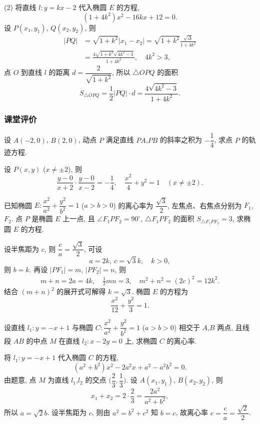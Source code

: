     (2) 将直线 $l\colon y=kx-2$ 代入椭圆 $E$ 的方程,
    \[(1+4k^2)x^2- 16kx+ 12=0.\]
    设 $P(x_1,y_1)$, $Q(x_2,y_2)$, 则
    \[\begin{aligned}
        |PQ|
        &= \sqrt{1+k^2}|x_1-x_2|
         = \sqrt{1+k^2}\frac{\sqrt{\Delta}}{1+4k^2}\\
        &= \frac{4\sqrt{1+k^2}\sqrt{4k^2-3}}{1+4k^2},\quad
        4k^2>3,
    \end{aligned}\]
    点 $O$ 到直线 $l$ 的距离 $d= \dfrac2{\sqrt{1+k^2}}$, 所以 $\triangle OPQ$ 的面积
    \[S_{\triangle OPQ}= \frac12|PQ|\cdot d
     = \frac{4\sqrt{4k^2-3}}{1+4k^2}.\]
\endsolution

\subsubsection{课堂评价}
\begin{exercise}
    设 $A(-2,0)$, $B(2,0)$, 动点 $P$ 满足直线 $PA$,$PB$ 的斜率之积为 $-\dfrac14$, 求点 $P$ 的轨迹方程.
\end{exercise}
\beginsolution
    设 $P(x,y)$ ($x\neq \pm2$), 则
    \[\frac{y-0}{x+2}\cdot \frac{y-0}{x-2}= -\frac14,\quad
    \frac{x^2}4+y^2= 1\quad (x\neq \pm2).\]
\endsolution

\begin{exercise}
    已知椭圆 $E\colon \dfrac{x^2}{a^2}+\dfrac{y^2}{b^2}=1$ ($a>b>0$) 的离心率为 $\dfrac{\sqrt3}2$, 左焦点、右焦点分别为 $F_1$,$F_2$. 点 $P$ 是椭圆 $E$ 上一点, 且 $\angle F_1PF_2= 90^\circ$, $\triangle F_1PF_2$ 的面积 $S_{\triangle F_1PF_2}= 3$, 求椭圆 $E$ 的方程.
\end{exercise}
\beginsolution
    设半焦距为 $c$, 则 $\dfrac{c}a= \dfrac{\sqrt3}2$, 可设
    \[a=2k,\ c=\sqrt3k,\quad k>0,\]
    则 $b=k$. 再设 $|PF_1|= m$, $|PF_2|= n$, 则
    \[\begin{gathered}
        m+n= 2a= 4k,\quad \frac12mn=3,\quad
        m^2+n^2= (2c)^2= 12k^2.
    \end{gathered}\]
    结合 $(m+n)^2$ 的展开式可解得 $k=\sqrt3$. 椭圆 $E$ 的方程为
    \[\frac{x^2}{12}+ \frac{y^2}{3}= 1.\]
\endsolution

\begin{exercise}
    设直线 $l_1\colon y=-x+1$ 与椭圆 $C\colon \dfrac{x^2}{a^2}+\dfrac{y^2}{b^2}=1$ ($a>b>0$) 相交于 $A$,$B$ 两点, 且线段 $AB$ 的中点 $M$ 在直线 $l_2\colon x-2y=0$ 上, 求椭圆 $C$ 的离心率.
\end{exercise}
\beginsolution
    将 $l_1\colon y=-x+1$ 代入椭圆 $C$ 的方程,
    \[(a^2+b^2)x^2- 2a^2x+ a^2-a^2b^2= 0.\]
    由题意, 点 $M$ 为直线 $l_1$,$l_2$ 的交点 $\biggl(\dfrac23,\dfrac13\biggr)$. 设 $A(x_1,y_1)$, $B(x_2,y_2)$, 则
    \[x_1+x_2= 2\cdot \frac23= \frac{2a^2}{a^2+b^2},\]
    所以 $a=\sqrt2b$. 设半焦距为 $c$, 则由 $a^2= b^2+c^2$ 知 $b=c$, 故离心率 $e= \dfrac{c}a= \dfrac{\sqrt2}2$.
\endsolution

